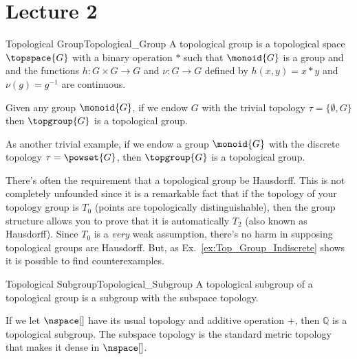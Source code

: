\documentclass[oneside]{book}                                                  %
\begin{document}
        \section{Lecture 2}
            \begin{fdefinition}{Topological Group}{Topological_Group}
                A topological group is a topological space $\topspace{G}$ with a
                binary operation $*$ such that $\monoid{G}$ is a group and and
                the functions $h:G\times{G}\rightarrow{G}$ and
                $\nu:G\rightarrow{G}$ defined by $h(x,y)=x*y$ and
                $\nu(g)=g^{\minus{1}}$ are continuous.
            \end{fdefinition}
            \begin{example}
                \label{ex:Top_Group_Indiscrete}%
                Given any group $\monoid{G}$, if we endow $G$ with the trivial
                topology $\tau=\{\emptyset,G\}$ then $\topgroup{G}$ is a
                topological group.
            \end{example}
            \begin{example}
                As another trivial example, if we endow a group $\monoid{G}$
                with the discrete topology $\tau=\powset{G}$, then
                $\topgroup{G}$ is a topological group. 
            \end{example}
            There's often the requirement that a topological group be Hausdorff.
            This is not completely unfounded since it is a remarkable fact that
            if the topology of your topology group is $T_{0}$ (points are
            topologically distinguishable), then the group structure allows you
            to prove that it is automatically $T_{2}$ (also known as Hausdorff).
            Since $T_{0}$ is a \textit{very} weak assumption, there's no harm in
            supposing topological groups are Hausdorff. But, as
            Ex.~\ref{ex:Top_Group_Indiscrete} shows it is possible to find
            counterexamples.
            \begin{fdefinition}{Topological Subgroup}{Topological_Subgroup}
                A topological subgroup of a topological group is a subgroup with
                the subspace topology.
            \end{fdefinition}
            \begin{example}
                If we let $\nspace[]$ have its usual topology and additive
                operation $+$, then $\mathbb{Q}$ is a topological subgroup. The
                subspace topology is the standard metric topology that makes it
                dense in $\nspace[]$.
            \end{example}
\end{document}
